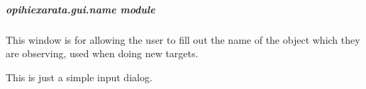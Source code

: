 \documentclass[letterpaper,11pt,english]{sphinxmanual}
\begin{document}
\sphinxstepscope


\subparagraph{opihiexarata.gui.name module}
\label{\detokenize{code/opihiexarata.gui.name:module-opihiexarata.gui.name}}\label{\detokenize{code/opihiexarata.gui.name:opihiexarata-gui-name-module}}\label{\detokenize{code/opihiexarata.gui.name::doc}}
\sphinxAtStartPar
This window is for allowing the user to fill out the name of the object
which they are observing, used when doing new targets.

\sphinxAtStartPar
This is just a simple input dialog.
\end{document}
